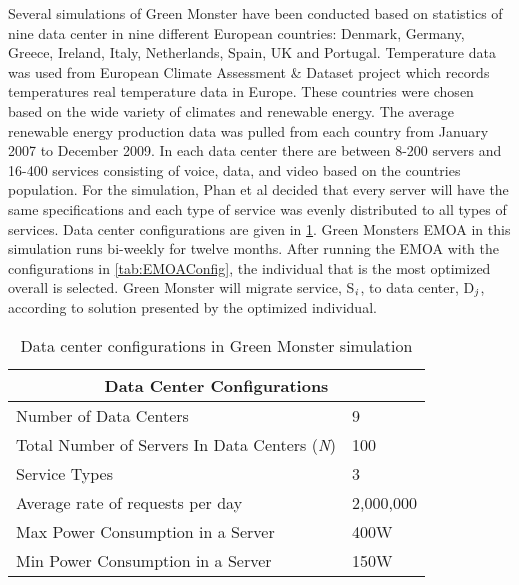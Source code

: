\documentclass{sig-alternate}
\begin{document}
Several simulations of Green Monster have been conducted based on statistics of nine data center in nine different European countries: Denmark, Germany, Greece, Ireland, Italy, Netherlands, Spain, UK and Portugal. Temperature data was used from European Climate Assessment \& Dataset project which records temperatures real temperature data in Europe. These countries were chosen based on the wide variety of climates and renewable energy. The average renewable energy production data was pulled from each country from January 2007 to December 2009. In each data center there are between 8-200 servers and 16-400 services consisting of voice, data, and video based on the countries population. For the simulation, Phan et al decided that every server will have the same specifications and each type of service was evenly distributed to all types of services. Data center configurations are given in \ref{tab:DCConfig}.  Green Monsters EMOA in this simulation runs bi-weekly for twelve months. After running the EMOA with the configurations in \ref{tab:EMOAConfig}, the individual that is the most optimized overall is selected. Green Monster will migrate service, S$_{\text{\emph{i}}}$, to data center, D$_{\text{\emph{j}}}$, according to solution presented by the optimized individual.

\begin{table}[tb]
\begin{center}
\begin{tabular}{|l|l|}
    \hline
    \multicolumn{2}{|c|}{\textbf{Data Center Configurations}} \\
    \hline
    Number of Data Centers & 9 \\
    Total Number of Servers In Data Centers (\emph{N}) & 100 \\
    Service Types & 3 \\
    Average rate of requests per day & 2,000,000 \\
    Max Power Consumption in a Server & 400W \\
   	Min Power Consumption in a Server & 150W\\
    \hline
\end{tabular}
\caption{Data center configurations in Green Monster simulation}
\label{tab:DCConfig}
\end{center}
\end{table}
\end{document}
